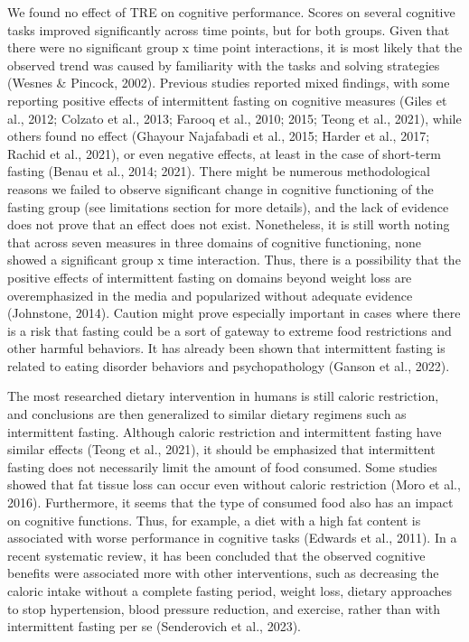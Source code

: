 \documentclass[authordate, empirical]{jote-new-article}
\begin{document}
We found no effect of TRE on cognitive performance. Scores on several cognitive tasks improved significantly across time points, but for both groups. Given that there were no significant group x time point interactions, it is most likely that the observed trend was caused by familiarity with the tasks and solving strategies (Wesnes \& Pincock, 2002). Previous studies reported mixed findings, with some reporting positive effects of intermittent fasting on cognitive measures (Giles et al., 2012; Colzato et al., 2013; Farooq et al., 2010; 2015; Teong et al., 2021), while others found no effect (Ghayour Najafabadi et al., 2015; Harder et al., 2017; Rachid et al., 2021), or even negative effects, at least in the case of short-term fasting (Benau et al., 2014; 2021). There might be numerous methodological reasons we failed to observe significant change in cognitive functioning of the fasting group (see limitations section for more details), and the lack of evidence does not prove that an effect does not exist. Nonetheless, it is still worth noting that across seven measures in three domains of cognitive functioning, none showed a significant group x time interaction. Thus, there is a possibility that the positive effects of intermittent fasting on domains beyond weight loss are overemphasized in the media and popularized without adequate evidence (Johnstone, 2014). Caution might prove especially important in cases where there is a risk that fasting could be a sort of gateway to extreme food restrictions and other harmful behaviors. It has already been shown that intermittent fasting is related to eating disorder behaviors and psychopathology (Ganson et al., 2022).



The most researched dietary intervention in humans is still caloric restriction, and conclusions are then generalized to similar dietary regimens such as intermittent fasting. Although caloric restriction and intermittent fasting have similar effects (Teong et al., 2021), it should be emphasized that intermittent fasting does not necessarily limit the amount of food consumed. Some studies showed that fat tissue loss can occur even without caloric restriction (Moro et al., 2016). Furthermore, it seems that the type of consumed food also has an impact on cognitive functions. Thus, for example, a diet with a high fat content is associated with worse performance in cognitive tasks (Edwards et al., 2011). In a recent systematic review, it has been concluded that the observed cognitive benefits were associated more with other interventions, such as decreasing the caloric intake without a complete fasting period, weight loss, dietary approaches to stop hypertension, blood pressure reduction, and exercise, rather than with intermittent fasting per se (Senderovich et al., 2023).
\end{document}
